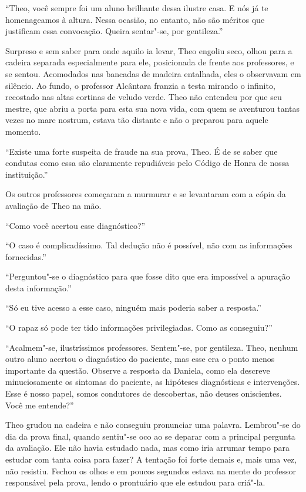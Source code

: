 ``Theo, você sempre foi um aluno brilhante dessa ilustre casa. E nós já
te homenageamos à altura. Nessa ocasião, no entanto, não são méritos que
justificam essa convocação. Queira sentar"-se, por gentileza.''

Surpreso e sem saber para onde aquilo ia levar, Theo engoliu seco, olhou
para a cadeira separada especialmente para ele, posicionada de frente
aos professores, e se sentou. Acomodados nas bancadas de madeira
entalhada, eles o observavam em silêncio. Ao fundo, o professor
Alcântara franzia a testa mirando o infinito, recostado nas altas
cortinas de veludo verde. Theo não entendeu por que seu mestre, que abriu
a porta para esta sua nova vida, com quem se aventurou tantas vezes no mare
nostrum, estava tão distante e não o preparou para aquele momento.

``Existe uma forte suspeita de fraude na sua prova, Theo. É de se saber
que condutas como essa são claramente repudiáveis pelo Código de Honra
de nossa instituição.''

Os outros professores começaram a murmurar e se levantaram com a cópia
da avaliação de Theo na mão.

``Como você acertou esse diagnóstico?''

``O caso é complicadíssimo. Tal dedução não é possível, não com as
informações fornecidas.''

``Perguntou"-se o diagnóstico para que fosse dito que era impossível a
apuração desta informação.''

``Só eu tive acesso a esse caso, ninguém mais poderia saber a
resposta.''

``O rapaz só pode ter tido informações privilegiadas. Como as
conseguiu?''

``Acalmem"-se, ilustríssimos professores. Sentem"-se, por gentileza. Theo,
nenhum outro aluno acertou o diagnóstico do paciente, mas esse era o
ponto menos importante da questão. Observe a resposta da Daniela, como
ela descreve minuciosamente os sintomas do paciente, as hipóteses
diagnósticas e intervenções. Esse é nosso papel, somos condutores de
descobertas, não deuses oniscientes. Você me entende?''

Theo grudou na cadeira e não conseguiu pronunciar uma palavra.
Lembrou"-se do dia da prova final, quando sentiu"-se oco ao se deparar
com a principal pergunta da avaliação. Ele não havia estudado nada,
mas como iria arrumar tempo para estudar com tanta coisa para fazer?
A tentação foi forte demais e, mais uma vez, não resistiu. Fechou os
olhos e em poucos segundos estava na mente do professor responsável pela
prova, lendo o prontuário que ele estudou para criá"-la.

